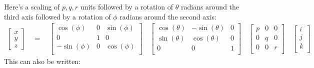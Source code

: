 \documentclass[letterpaper,10pt,english]{sphinxmanual}
\begin{document}
Here’s a scaling of \(p, q, r\) units followed by a rotation of \(\theta\) radians
around the third axis followed by a rotation of \(\phi\) radians around the
second axis:
\begin{equation*}
\begin{split}
\begin{bmatrix}
x \\
y \\
z
\end{bmatrix}
\quad
=
\quad
\begin{bmatrix}
\cos(\phi) & 0 & \sin(\phi) \\
0 & 1 & 0 \\
-\sin(\phi) & 0 & \cos(\phi) \\
\end{bmatrix}
\quad
\begin{bmatrix}
\cos(\theta) &  -\sin(\theta) & 0 \\
\sin(\theta) & \cos(\theta) & 0 \\
0 & 0 & 1 \\
\end{bmatrix}
\quad
\begin{bmatrix}
p & 0 & 0 \\
0 & q & 0 \\
0 & 0 & r \\
\end{bmatrix}
\quad
\begin{bmatrix}
i\\
j\\
k\\
\end{bmatrix}
\end{split}
\end{equation*}
This can also be written:
\end{document}
